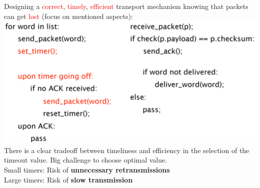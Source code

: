 \documentclass[a4paper, fontsize=8pt, landscape, DIV=1]{scrartcl}
\begin{document}
\begin{multicols*}{4}
    		Designing a \textcolor{Red}{correct}, \textcolor{Red}{timely}, \textcolor{Red}{efficient} transport mechanism knowing that packets can get \textcolor{Red}{lost} (focus on mentioned aspects):
    		\includegraphics[width=\columnwidth]{images/Concepts/send_packet.png} 	 
    		There is a clear tradeoff between timeliness and efficiency in the selection of the timeout value. Big challenge to choose optimal value.\\
    		Small timers: Risk of \textbf{unnecessary retransmissions}\\
    		Large timers: Risk of \textbf{slow transmission} \par
    		

\end{multicols*}
\end{document}

